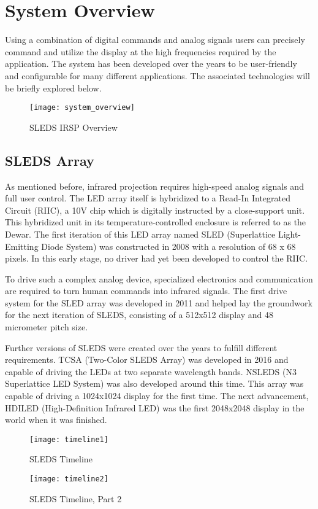 %
%
\chapter{System Overview}
Using a combination of digital commands and analog signals users can precisely command and utilize the display at the high frequencies required by the application. The system has been developed over the years to be user-friendly and configurable for many different applications. The associated technologies will be briefly explored below.
\begin {figure}[h]
\texttt{[image: system\_overview]}
\centering
\caption {SLEDS IRSP Overview \cite{chris}}
\centering
\end {figure}


\section{SLEDS Array}
As mentioned before, infrared projection requires high-speed analog signals and full user control. The LED array itself is hybridized to a Read-In Integrated Circuit (RIIC), a 10V chip which is digitally instructed by a close-support unit. This hybridized unit in its temperature-controlled enclosure is referred to as the Dewar. The first iteration of this LED array named SLED (Superlattice Light-Emitting Diode System) was constructed in 2008 with a resolution of 68 x 68 pixels. In this early stage, no driver had yet been developed to control the RIIC. \cite{chris}\par
To drive such a complex analog device, specialized electronics and communication are required to turn human commands into infrared signals. The first drive system for the SLED array was developed in 2011 and helped lay the groundwork for the next iteration of SLEDS, consisting of a 512x512 display and 48 micrometer pitch size.\cite{chris} \par
Further versions of SLEDS were created over the years to fulfill different requirements. TCSA (Two-Color SLEDS Array) was developed in 2016 and capable of driving the LEDs at two separate wavelength bands. NSLEDS (N3 Superlattice LED System) was also developed around this time. This array was capable of driving a 1024x1024 display for the first time. The next advancement, HDILED (High-Definition Infrared LED) was the first 2048x2048 display in the world when it was finished. \par
\begin {figure}[h]
\texttt{[image: timeline1]}
\centering
\caption {SLEDS Timeline \cite{chris}}
\centering
\end {figure}
\begin {figure}[h]
\texttt{[image: timeline2]}
\centering
\caption {SLEDS Timeline, Part 2 \cite{chris}}
\centering
\end {figure}

